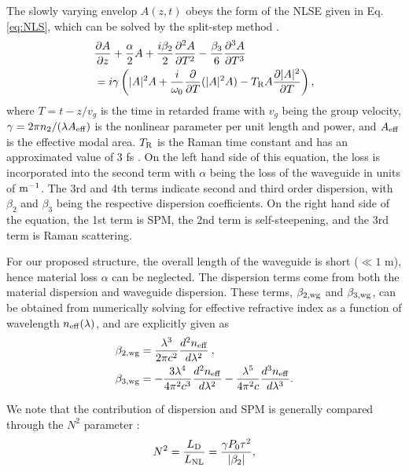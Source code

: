 The slowly varying envelop $A(z,t)$ obeys the form of the NLSE given in Eq. \ref{eq:NLS}, which can be solved by the split-step method \cite{weideman1986split}.
\begin{align}
\begin{split}
&\frac{\partial A}{\partial z}+\frac{\alpha}{2}A+\frac{i\beta_2}{2}\frac{\partial^2A}{\partial T^2}-\frac{\beta_3}{6}\frac{\partial^3 A}{\partial T^3}\\
&=i\gamma \left(|A|^2A+\frac{i}{\omega_0}\frac{\partial}{\partial T}(|A|^2A)-T_{\rm{R}}A\frac{\partial |A|^2}{\partial T}\right),
\label{eq:NLS}
\end{split}
\end{align}
where $T=t-z/v_g$ is the time in retarded frame with $v_g$ being the group velocity, $\gamma=2\pi n_2/(\lambda A_{\rm{eff}})$ is the nonlinear parameter per unit length and power, and $A_{\rm{eff}}$ is the effective modal area. $T_{\rm{R}}$ is the Raman time constant and has an approximated value of 3 fs \cite{atieh1999measuring}. On the left hand side of this equation, the loss is incorporated into the second term with $\alpha$ being the loss of the waveguide in units of $\rm{m}^{-1}$. The 3rd and 4th terms indicate second and third order dispersion, with $\beta_2$ and $\beta_3$ being the respective dispersion coefficients. On the right hand side of the equation, the 1st term is SPM, the 2nd term is self-steepening, and the 3rd term is Raman scattering.

For our proposed structure, the overall length of the waveguide is short ($\ll1$ m), hence material loss $\alpha$ can be neglected. The dispersion terms come from both the material dispersion and waveguide dispersion. These terms, $\beta_{2,\rm{wg}}$ and $\beta_{3,\rm{wg}}$, can be obtained from numerically solving for effective refractive index as a function of wavelength $n_{\rm{eff}}(\lambda)$, and are explicitly given as
\begin{align}
\beta_{2,\rm{wg}}&=\frac{\lambda^3}{2\pi c^2}\frac{d^2n_{\rm{eff}}}{d\lambda^2}\:,\\
\beta_{3,\rm{wg}}&=-\frac{3\lambda^4}{4\pi^2 c^3}\frac{d^2n_{\rm{eff}}}{d\lambda^2}-\frac{\lambda^5}{4\pi^2 c}\frac{d^3n_{\rm{eff}}}{d\lambda^3}.
\end{align}

We note that the contribution of dispersion and SPM is generally compared through the $N^2$ parameter \cite{agrawal2007nonlinear}:
\begin{equation}
N^2=\frac{L_{\rm{D}}}{L_{\rm{NL}}}=\frac{\gamma P_0 \tau^2}{|\beta_2|},
\end{equation}

